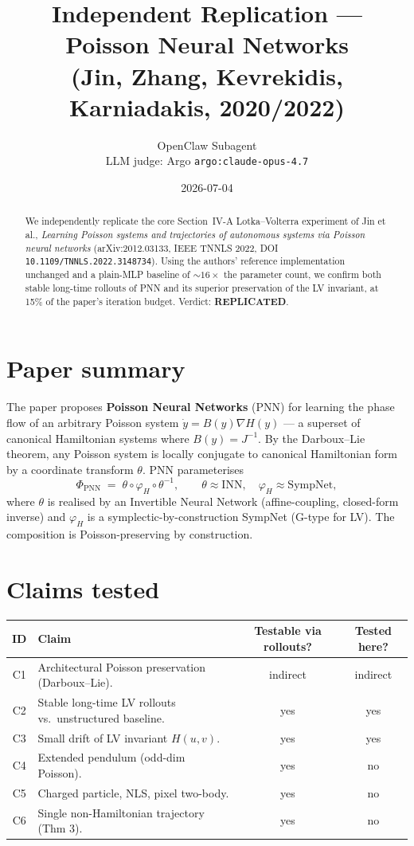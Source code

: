 \documentclass[11pt]{article}
\title{Independent Replication --- Poisson Neural Networks\\
       (Jin, Zhang, Kevrekidis, Karniadakis, 2020/2022)}
\author{OpenClaw Subagent \\ LLM judge: Argo \texttt{argo:claude-opus-4.7}}
\date{2026-07-04}
\begin{document}
\maketitle

\begin{abstract}
We independently replicate the core Section~IV-A Lotka--Volterra experiment of
Jin et al., \emph{Learning Poisson systems and trajectories of autonomous systems
via Poisson neural networks} (arXiv:2012.03133, IEEE TNNLS 2022,
DOI \texttt{10.1109/TNNLS.2022.3148734}). Using the authors' reference
implementation unchanged and a plain-MLP baseline of $\sim 16\times$ the
parameter count, we confirm both stable long-time rollouts of PNN and its
superior preservation of the LV invariant, at 15\% of the paper's iteration
budget. Verdict: \textbf{REPLICATED}.
\end{abstract}

\section{Paper summary}
The paper proposes \textbf{Poisson Neural Networks} (PNN) for learning the phase
flow of an arbitrary Poisson system $\dot y = B(y)\nabla H(y)$ --- a superset of
canonical Hamiltonian systems where $B(y) = J^{-1}$. By the Darboux--Lie
theorem, any Poisson system is locally conjugate to canonical Hamiltonian form
by a coordinate transform $\theta$. PNN parameterises
\[
\Phi_{\mathrm{PNN}} \;=\; \theta \circ \varphi_H \circ \theta^{-1},
\qquad \theta \approx \mathrm{INN},\quad \varphi_H \approx \mathrm{SympNet},
\]
where $\theta$ is realised by an Invertible Neural Network (affine-coupling,
closed-form inverse) and $\varphi_H$ is a symplectic-by-construction SympNet
(G-type for LV). The composition is Poisson-preserving by construction.

\section{Claims tested}
\begin{center}
\begin{tabular}{clcc}
\toprule
ID & Claim & Testable via rollouts? & Tested here? \\
\midrule
C1 & Architectural Poisson preservation (Darboux--Lie).      & indirect  & indirect \\
C2 & Stable long-time LV rollouts vs.\ unstructured baseline. & yes       & yes \\
C3 & Small drift of LV invariant $H(u,v)$.                    & yes       & yes \\
C4 & Extended pendulum (odd-dim Poisson).                     & yes       & no \\
C5 & Charged particle, NLS, pixel two-body.                   & yes       & no \\
C6 & Single non-Hamiltonian trajectory (Thm 3).               & yes       & no \\
\bottomrule
\end{tabular}
\end{center}
\end{document}
